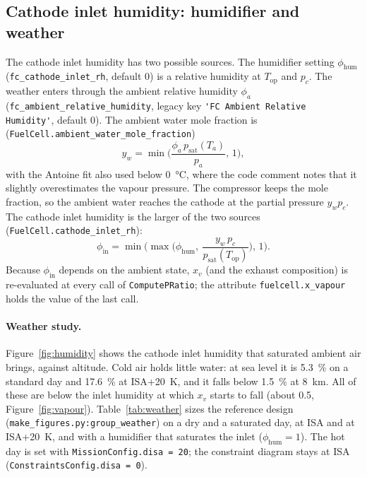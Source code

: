\documentclass[a4paper,11pt]{article}
\newcommand{\code}[1]{\nolinkurl{#1}}
\newcommand{\fn}[1]{\nolinkurl{#1}}
\begin{document}
\subsection{Cathode inlet humidity: humidifier and weather}
\label{sec:humidity}

The cathode inlet humidity has two possible sources. The humidifier setting
$\phi_\mathrm{hum}$ (\code{fc_cathode_inlet_rh}, default 0) is a relative humidity at
$T_\mathrm{op}$ and $p_c$. The weather enters through the ambient relative humidity
$\phi_a$ (\code{fc_ambient_relative_humidity}, legacy key \code{'FC Ambient Relative
Humidity'}, default 0). The ambient water mole fraction is
(\fn{FuelCell.ambient_water_mole_fraction})
\begin{equation}
  y_w = \min\!\Big(\frac{\phi_a\, p_\mathrm{sat}(T_a)}{p_a},\,1\Big),
\end{equation}
with the Antoine fit also used below \SI{0}{\celsius}, where the code comment notes that it
slightly overestimates the vapour pressure. The compressor keeps the mole fraction, so the
ambient water reaches the cathode at the partial pressure $y_w p_c$. The cathode inlet humidity
is the larger of the two sources (\fn{FuelCell.cathode_inlet_rh}):
\begin{equation}
  \phi_\mathrm{in} = \min\!\Big(\max\Big(\phi_\mathrm{hum},\ \frac{y_w\,p_c}{p_\mathrm{sat}(T_\mathrm{op})}\Big),\,1\Big).
\end{equation}
Because $\phi_\mathrm{in}$ depends on the ambient state, $x_v$ (and the exhaust composition)
is re-evaluated at every call of \fn{ComputePRatio}; the attribute \code{fuelcell.x_vapour}
holds the value of the last call.

\paragraph{Weather study.} Figure~\ref{fig:humidity} shows the cathode inlet humidity that
saturated ambient air brings, against altitude. Cold air holds little water: at sea level it is
\SI{5.3}{\percent} on a standard day and \SI{17.6}{\percent} at ISA+\SI{20}{K}, and it falls
below \SI{1.5}{\percent} at \SI{8}{km}. All of these are below the inlet humidity at which $x_v$
starts to fall (about 0.5, Figure~\ref{fig:vapour}). Table~\ref{tab:weather} sizes the reference
design (\fn{make_figures.py:group_weather}) on a dry and a saturated day, at ISA and at
ISA+\SI{20}{K}, and with a humidifier that saturates the inlet ($\phi_\mathrm{hum}=1$). The hot day
is set with \code{MissionConfig.disa = 20}; the constraint diagram stays at ISA
(\code{ConstraintsConfig.disa = 0}).
\end{document}
